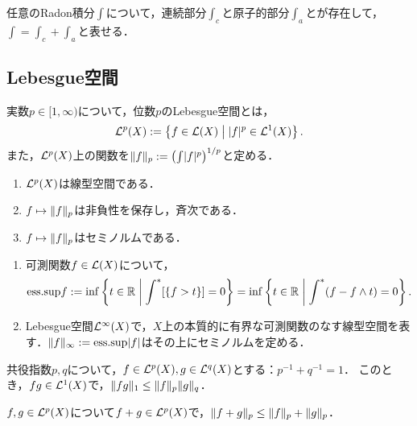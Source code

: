 \documentclass[uplatex,dvipdfmx]{jsreport}
\begin{document}
\begin{lemma}
    任意のRadon積分$\int$について，連続部分$\int_c$と原子的部分$\int_a$とが存在して，$\int=\int_c+\int_a$と表せる．
\end{lemma}

\subsection{Lebesgue空間}

\begin{definition}
    実数$p\in[1,\infty)$について，位数$p$のLebesgue空間とは，
    \[\mathcal{L}^p(X):=\left\{f\in\mathcal{L}(X)\;\middle|\;\lvert f\rvert^p\in\mathcal{L}^1(X)\right\}.\]
    また，$\mathcal{L}^p(X)$上の関数を$\|f\|_p:=\left(\int\lvert f\rvert^p\right)^{1/p}$と定める．
\end{definition}

\begin{lemma}\mbox{}
    \begin{enumerate}
        \item $\mathcal{L}^p(X)$は線型空間である．
        \item $f\mapsto\|f\|_p$は非負性を保存し，斉次である．
        \item $f\mapsto\|f\|_p$はセミノルムである．
    \end{enumerate}
\end{lemma}

\begin{definition}\mbox{}
    \begin{enumerate}
        \item 可測関数$f\in\mathcal{L}(X)$について，
        \[\mathrm{ess.sup} f:=\inf\left\{t\in\mathbb{R}\;\middle|\;\int^*[\{f>t\}]=0\right\}=\inf\left\{t\in\mathbb{R}\;\middle|\;\int^*(f-f\land t)=0\right\}.\]
        \item Lebesgue空間$\mathcal{L}^\infty(X)$で，$X$上の本質的に有界な可測関数のなす線型空間を表す．$\|f\|_\infty:=\mathrm{ess.sup}\lvert f\rvert$はその上にセミノルムを定める．
    \end{enumerate}
\end{definition}

\begin{lemma}
    共役指数$p,q$について，$f\in\mathcal{L}^p(X),g\in\mathcal{L}^q(X)$とする：$p^{-1}+q^{-1}=1$．
    このとき，$fg\in\mathcal{L}^1(X)$で，$\|fg\|_1\le\|f\|_p\|g\|_q$．
\end{lemma}

\begin{lemma}
    $f,g\in\mathcal{L}^p(X)$について$f+g\in\mathcal{L}^p(X)$で，$\|f+g\|_p\le\|f\|_p+\|g\|_p$．
\end{lemma}
\end{document}
